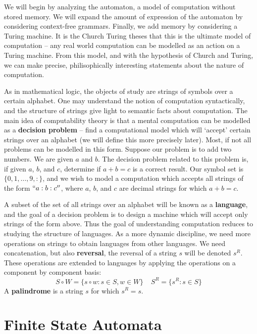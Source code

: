 We will begin by analyzing the automaton, a model of computation without stored memory. We will expand the amount of expression of the automaton by considering context-free grammars. Finally, we add memory by considering a Turing machine. It is the Church Turing theses that this is the ultimate model of computation -- any real world computation can be modelled as an action on a Turing machine. From this model, and with the hypothesis of Church and Turing, we can make precise, philisophically interesting statements about the nature of computation.

As in mathematical logic, the objects of study are strings of symbols over a certain alphabet. One may understand the notion of computation syntactically, and the structure of strings give light to semantic facts about computation. The main idea of computability theory is that a mental computation can be modelled as a {\bf decision problem} -- find a computational model which will `accept' certain strings over an alphabet (we will define this more precisely later). Most, if not all problems can be modelled in this form. Suppose our problem is to add two numbers. We are given $a$ and $b$. The decision problem related to this problem is, if given $a$, $b$, and $c$, determine if $a + b = c$ is a correct result. Our symbol set is $\{ 0, 1, \dots, 9, : \}$, and we wish to model a computation which accepts all strings of the form $``a:b:c''$, where $a$, $b$, and $c$ are decimal strings for which $a + b = c$.

A subset of the set of all strings over an alphabet will be known as a {\bf language}, and the goal of a decision problem is to design a machine which will accept only strings of the form above. Thus the goal of understanding computation reduces to studying the structure of languages. As a more dynamic discipline, we need more operations on strings to obtain languages from other languages. We need concatenation, but also {\bf reversal}, the reversal of a string $s$ will be denoted $s^R$. These operations are extended to languages by applying the operations on a component by component basis:
%
\[ S \circ W = \{ s \circ w : s \in S, w \in W \}\ \ \ \ \ S^R = \{ s^R : s \in S \} \]
%
A {\bf palindrome} is a string $s$ for which $s^R = s$.



\chapter{Finite State Automata}

